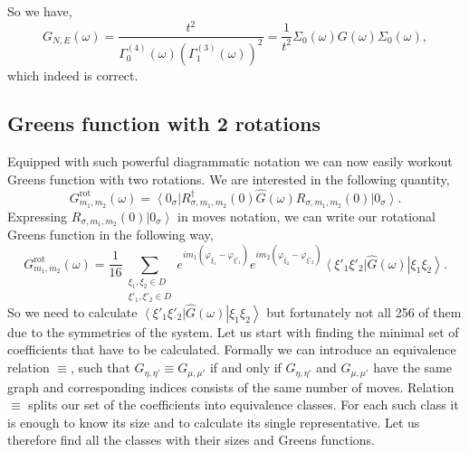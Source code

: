 \documentclass{article}
\newcommand{\ket}[1]{\left\vert #1 \right\rangle}
\newcommand{\bra}[1]{\left\langle #1 \right\vert}
\begin{document}
So we have,
\begin{equation}
    G_{N,E}(\omega) = \frac{t^2}
    {\Gamma_0^{(4)}(\omega)\left(\Gamma_1^{(3)}(\omega)\right)^2}
    = \frac{1}{t^2}\Sigma_0(\omega)G(\omega)\Sigma_0(\omega),
\end{equation}
which indeed is correct.

\subsection{Greens function with 2 rotations}
Equipped with such powerful diagrammatic notation we can now easily workout Greens function with two rotations. We are interested in the following quantity,
\begin{equation}
    G^{\text{rot}}_{m_1, m_2}(\omega) = 
    \bra{0_\sigma}R^{\dag}_{\sigma,m_1,m_2}(0) 
        \hat{G}(\omega)
    R_{\sigma,m_1,m_2}(0) \ket{0_\sigma}.
\end{equation}
Expressing $R_{\sigma,m_1,m_2}(0) \ket{0_\sigma}$ in moves notation, we can write our rotational Greens function in the following way,
\begin{equation}
    G^{\text{rot}}_{m_1,m_2}(\omega) = 
    \frac{1}{16}\sum_{\substack{
        \xi_1, \xi_2 \in D \\ 
        \xi'_1, \xi'_2 \in D
    }}
        e^{i m_1 (\varphi_{\xi_1} - \varphi_{\xi'_1})}
        e^{i m_2 (\varphi_{\xi_2} - \varphi_{\xi'_2})}
        \bra{\xi'_1 \xi'_2}\hat{G}(\omega)\ket{\xi_1 \xi_2}.
\end{equation}
So we need to calculate $\bra{\xi'_1 \xi'_2}\hat{G}(\omega)\ket{\xi_1 \xi_2}$ but fortunately not all 256 of them due to the symmetries of the system. Let us start with finding the minimal set of coefficients that have to be calculated. Formally we can introduce an equivalence relation $\equiv$, such that $G_{\eta,\eta'} \equiv G_{\mu,\mu'}$ if and only if $G_{\eta,\eta'}$ and $G_{\mu,\mu'}$ have the same graph and corresponding indices consists of the same number of moves. Relation $\equiv$ splits our set of the coefficients into equivalence classes. For each such class it is enough to know its size and to calculate its single representative. Let us therefore find all the classes with their sizes and Greens functions.
\end{document}
